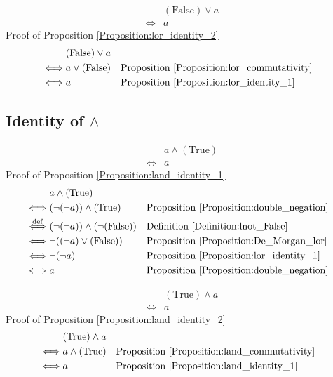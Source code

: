 \begin{prop}
\label{Proposition:lor_identity_2}
\begin{align*}
& (\text{False}) \lor a \\
\iff & a
\end{align*}
Proof of Proposition \ref{Proposition:lor_identity_2}
\begin{align*}
& (\text{False}) \lor a \\
\iff & a \lor (\text{False})
& & \text{Proposition \ref{Proposition:lor_commutativity}} \\
\iff & a
& & \text{Proposition \ref{Proposition:lor_identity_1}} \\
\end{align*}
\end{prop}

\subsection{Identity of $\land$}
\begin{prop}
\label{Proposition:land_identity_1}
\begin{align*}
& a \land (\text{True}) \\
\iff & a
\end{align*}
Proof of Proposition \ref{Proposition:land_identity_1}
\begin{align*}
& a \land (\text{True}) \\
\iff & (\lnot (\lnot a)) \land (\text{True})
& & \text{Proposition \ref{Proposition:double_negation}} \\
\overset{\operatorname{def}}{\iff} & (\lnot (\lnot a)) \land (\lnot (\text{False}))
& & \text{Definition \ref{Definition:lnot_False}} \\
\iff & \lnot ((\lnot a) \lor (\text{False}))
& & \text{Proposition \ref{Proposition:De_Morgan_lor}} \\
\iff & \lnot (\lnot a)
& & \text{Proposition \ref{Proposition:lor_identity_1}} \\
\iff & a
& & \text{Proposition \ref{Proposition:double_negation}} \\
\end{align*}
\end{prop}

\begin{prop}
\label{Proposition:land_identity_2}
\begin{align*}
& (\text{True}) \land a \\
\iff & a
\end{align*}
Proof of Proposition \ref{Proposition:land_identity_2}
\begin{align*}
& (\text{True}) \land a \\
\iff & a \land (\text{True})
& & \text{Proposition \ref{Proposition:land_commutativity}} \\
\iff & a
& & \text{Proposition \ref{Proposition:land_identity_1}} \\
\end{align*}
\end{prop}

